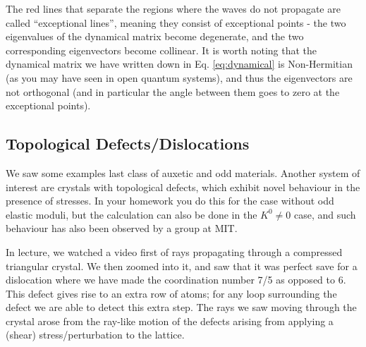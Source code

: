 The red lines that separate the regions where the waves do not propagate are called ``exceptional lines'', meaning they consist of exceptional points - the two eigenvalues of the dynamical matrix become degenerate, and the two corresponding eigenvectors become collinear. It is worth noting that the dynamical matrix we have written down in Eq. \eqref{eq:dynamical} is Non-Hermitian (as you may have seen in open quantum systems), and thus the eigenvectors are not orthogonal (and in particular the angle between them goes to zero at the exceptional points).

\subsection{Topological Defects/Dislocations}
We saw some examples last class of auxetic and odd materials. Another system of interest are crystals with topological defects, which exhibit novel behaviour in the presence of stresses. In your homework you do this for the case without odd elastic moduli, but the calculation can also be done in the $K^0 \neq 0$ case, and such behaviour has also been observed by a group at MIT.

In lecture, we watched a video first of rays propagating through a compressed triangular crystal. We then zoomed into it, and saw that it was perfect save for a dislocation where we have made the coordination number 7/5 as opposed to 6. This defect gives rise to an extra row of atoms; for any loop surrounding the defect we are able to detect this extra step. The rays we saw moving through the crystal arose from the ray-like motion of the defects arising from applying a (shear) stress/perturbation to the lattice. 

